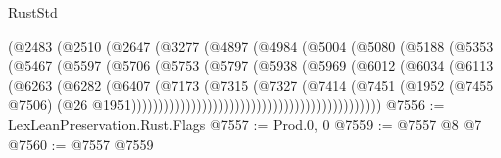 \begin{lexlean}{RustStd}
\begin{coremodule}
                                    (@2483
                                      (@2510
                                        (@2647
                                          (@3277
                                            (@4897
                                              (@4984
                                                (@5004
                                                  (@5080
                                                    (@5188
                                                      (@5353
                                                        (@5467
                                                          (@5597
                                                            (@5706
                                                              (@5753
                                                                (@5797
                                                                  (@5938
                                                                    (@5969
                                                                      (@6012
                                                                        (@6034
                                                                          (@6113
                                                                            (@6263
                                                                              (@6282
                                                                                (@6407
                                                                                  (@7173
                                                                                    (@7315
                                                                                      (@7327
                                                                                        (@7414
                                                                                          (@7451
                                                                                            (@1952
                                                                                              (@7455
                                                                                                @7506)
                                                                                              (@26
                                                                                                @1951))))))))))))))))))))))))))))))))))))))))))))))
@7556 := LexLeanPreservation.Rust.Flags
@7557 := Prod.{0, 0}
@7559 := @7557 @8 @7
@7560 := @7557 @7559

\end{coremodule}
\end{lexlean}
